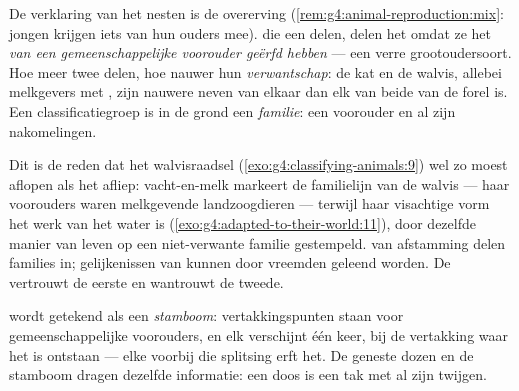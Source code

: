 \begin{proposition}\label{prop:g6:classification-kinship:kinship}
De verklaring van het nesten is de overerving
(\cref{rem:g4:animal-reproduction:mix}: jongen krijgen iets van hun
ouders mee).  die een  delen, delen het omdat ze het
\emph{van een gemeenschappelijke voorouder geërfd hebben} --- een verre
grootoudersoort. Hoe meer  twee  delen, hoe nauwer hun
\emph{verwantschap}: de kat en de walvis, allebei
melkgevers met , zijn nauwere neven van elkaar dan elk van beide van
de forel is. Een classificatiegroep is in de grond een \emph{familie}:
een voorouder en al zijn nakomelingen.
\end{proposition}
\admitted

\begin{example}\label{ex:g6:classification-kinship:whale}
Dit is de reden dat het walvisraadsel
(\cref{exo:g4:classifying-animals:9}) wel zo moest aflopen als het
afliep: vacht-en-melk markeert de familielijn van de walvis --- haar
voorouders waren melkgevende landzoogdieren --- terwijl haar visachtige
vorm het werk van het water is
(\cref{exo:g4:adapted-to-their-world:11}), door dezelfde manier van leven
op een niet-verwante familie gestempeld.  van afstamming delen
families in; gelijkenissen van  kunnen door vreemden geleend
worden. De  vertrouwt de eerste en wantrouwt de tweede.
\end{example}

\begin{definition}\label{def:g6:classification-kinship:tree}
 wordt getekend als een \emph{stamboom}:
vertakkingspunten staan voor gemeenschappelijke voorouders, en elk
 verschijnt één keer, bij de vertakking waar het is ontstaan ---
elke  voorbij die splitsing erft het. De geneste dozen en de
stamboom dragen dezelfde informatie: een doos is een tak met al zijn
twijgen.
\end{definition}

